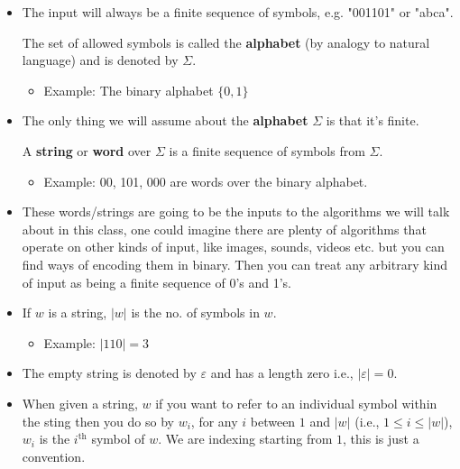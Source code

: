 \documentclass[11pt]{article}
\begin{document}
\begin{itemize}
    \item The input will always be a finite sequence of symbols, e.g. "001101" or "abca".
    
    \begin{tcolorbox} [title= Definition:, colback=black!10!white]
        The set of allowed symbols is called the \textbf{alphabet} (by analogy to natural language) and is denoted by $\Sigma$.
    \end{tcolorbox}
    \begin{itemize}
        \item[$	$] Example: The binary alphabet $\{0,1\}$
    \end{itemize}
    \item The only thing we will assume about the \textbf{alphabet} $\Sigma$ is that it's finite.
    \begin{tcolorbox} [title= Definition:, colback=black!10!white]
        A \textbf{string} or \textbf{word} over $\Sigma$ is a finite sequence of symbols from $\Sigma$.
    \end{tcolorbox}
    \begin{itemize}
        \item[$ $] Example: 00, 101, 000 are words over the binary alphabet.
    \end{itemize}
    \item These words/strings are going to be the inputs to the algorithms we will talk about in this class, one could imagine there are plenty of algorithms that operate on other kinds of input, like images, sounds, videos etc. but you can find ways of encoding them in binary. Then you can treat any arbitrary kind of input as being a finite sequence of 0's and 1's.
    \item If $w$ is a string, $|w|$ is the no. of symbols in $w$.
    \begin{itemize}
        \item[$ $] Example: $|110|=3$
    \end{itemize}
    \item The empty string is denoted by $\varepsilon$ and has a length zero i.e., $|\varepsilon|=0$.
    \item When given a string, $w$ if you want to refer to an individual symbol within the sting then you do so by $w_i$, for any $i$ between $1$ and $|w|$ (i.e., $1\le i \le |w|$), $w_i$ is the $i^{\text{th}}$ symbol of $w$. We are indexing starting from $1$, this is just a convention.
    \begin{itemize}

\end{itemize}
\end{itemize}
\end{document}

